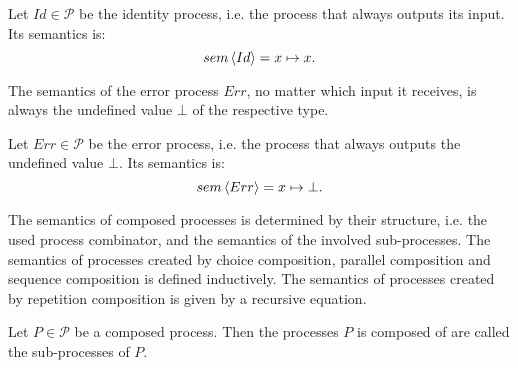 \begin{definition}
\label{def:sem_id}
Let $Id \in \mathcal{P}$ be the identity process, i.e. the process that always outputs its input. Its semantics is:
\begin{equation*}
  \label{eqn:sem_id}
  sem \left\langle Id \right\rangle = x \mapsto x.
\end{equation*}
  \vspace*{-0.5em}
  \hfill\qedsymbol
\end{definition}


The semantics of the error process $Err$, no matter which input it receives, is always the undefined value $\bot$ of the respective type. 
\begin{definition}
\label{def:sem_err}
Let $Err \in \mathcal{P}$ be the error process, i.e. the process that always outputs the undefined value $\bot$. Its semantics is:
  \begin{equation*}
    \label{eqn:sem_error}
    sem \left\langle Err \right\rangle = x \mapsto \bot.
  \end{equation*}
  \vspace*{-0.5em}
  \hfill\qedsymbol
\end{definition}

The semantics of composed processes is determined by their structure, i.e. the used process combinator, and the semantics of the involved sub-processes. The semantics of processes created by choice composition, parallel composition and sequence composition is defined inductively. The semantics of processes created by repetition composition is given by a recursive equation.

\begin{definition}
Let $P \in \mathcal{P}$ be a composed process. Then the processes $P$ is composed of are called the sub-processes of $P$.

\hfill\qedsymbol
\end{definition}


